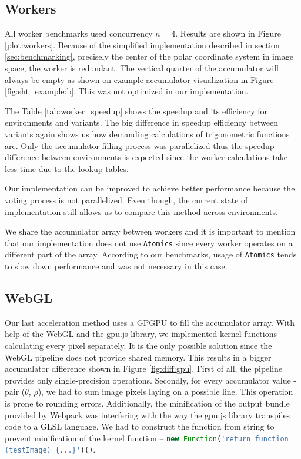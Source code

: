 

\subsection{Workers}

All worker benchmarks used concurrency $n=4$. Results are shown in Figure \ref{plot:workers}. Because of the simplified implementation described in section \ref{sec:benchmarking}, precisely the center of the polar coordinate system in image space, the  worker is redundant. The  vertical quarter of the accumulator will always be empty as shown on example accumulator visualization in Figure \ref{fig:sht_example:b}. This was not optimized in our implementation.


The Table \ref{tab:worker_speedup} shows the speedup and its efficiency for environments and variants. The big difference in speedup efficiency between variants again shows us how demanding calculations of trigonometric functions are. Only the accumulator filling process was parallelized thus the speedup difference between environments is expected since the worker calculations take less time due to the lookup tables.

 
Our implementation can be improved to achieve better performance because the voting process is not parallelized. Even though, the current state of implementation still allows us to compare this method across environments.


We share the accumulator array between workers and it is important to mention that our implementation does not use \texttt{Atomics} since every worker operates on a different part of the array. According to our benchmarks, usage of \texttt{Atomics} tends to slow down performance and was not necessary in this case.



\subsection{WebGL}

Our last acceleration method uses a GPGPU to fill the accumulator array. With help of the WebGL and the gpu.js library, we implemented kernel functions calculating every pixel separately. It is the only possible solution since the WebGL pipeline does not provide shared memory. This results in a bigger accumulator difference shown in Figure \ref{fig:diff:gpu}. First of all, the pipeline provides only single-precision operations. Secondly, for every accumulator value - pair ($\theta$, $\rho$), we had to sum image pixels laying on a possible line. This operation is prone to rounding errors. Additionally, the minification of the output bundle provided by Webpack was interfering with the way the gpu.js library transpiles code to a GLSL language. We had to construct the function from string to prevent minification of the kernel function -- \lstinline[language=JavaScript]|new Function('return function (testImage) {...}')()|.

